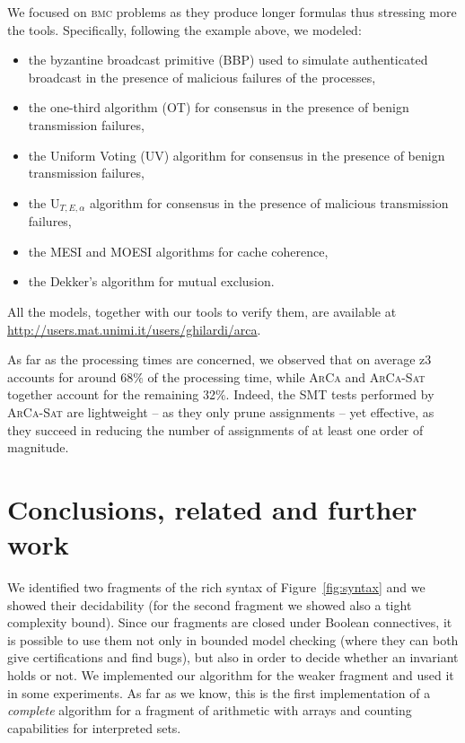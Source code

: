 \documentclass[11pt,a4paper]{article}
\begin{document}
{We focused on \textsc{bmc} problems as they produce longer formulas thus stressing more the tools.
Specifically, following the example above, we modeled: 
\begin{itemize}
\item the byzantine broadcast primitive (BBP) \cite{toueg87} used to simulate authenticated broadcast in the presence of malicious failures of the processes, 
\item the one-third algorithm (OT) \cite{sharpie} for consensus in the presence of benign transmission failures, 
\item the Uniform Voting (UV) algorithm \cite{heardof} for consensus in the presence of benign transmission failures, 
\item the U$_{T,E,\alpha}$ algorithm \cite{Biely07} for consensus in the presence of malicious transmission failures, 
\item the MESI \cite{Patel84} and MOESI \cite{MOESI} algorithms for cache coherence,
\item the Dekker's algorithm \cite{Dekker} for mutual exclusion. 
\end{itemize}
All the models, together with our tools to verify them, are available at \url{http://users.mat.unimi.it/users/ghilardi/arca}.

As far as the processing times are concerned, we observed that on average z3 accounts for around 68$\%$ of the processing time, while \textsc{ArCa} and \textsc{ArCa-Sat} together account for the remaining 32$\%$.
Indeed, the SMT tests performed by \textsc{ArCa-Sat} are lightweight -- as they only prune assignments -- yet effective, as they succeed in reducing the number of assignments of at least one order of magnitude. 
 
\section{Conclusions, related and further work}\label{sec:conclusions}

We identified two  fragments of the rich syntax of Figure~\ref{fig:syntax} 
and we showed their decidability (for the second fragment we showed also a tight complexity bound). Since our fragments are closed under Boolean connectives, it is possible to use them not only in  bounded model checking
(where they can both give certifications and find bugs), but also
in order to decide whether an invariant holds or not. We implemented our algorithm for the weaker fragment and used it in some experiments.
As far as we know, this is the first implementation of a \emph{complete} algorithm for a fragment of arithmetic with arrays and counting capabilities for interpreted sets.   
 
}
\end{document}
